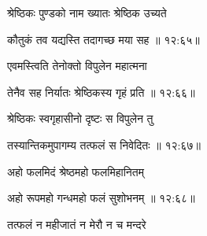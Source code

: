 {\devanagarifont श्रेष्ठिकः पुण्डको नाम ख्यातः श्रेष्ठिक उच्यते \thinspace{\dandab} \dontdisplaylinenum }%
 

{\devanagarifont कौतुकं तव यद्यस्ति तदागच्छ मया सह {॥ १२:६५॥} \veg\dontdisplaylinenum }%
 
{\devanagarifont एवमस्त्विति तेनोक्तो विपुलेन महात्मना \thinspace{\dandab} \dontdisplaylinenum }%


{\devanagarifont तेनैव सह निर्यातः श्रेष्ठिकस्य गृहं प्रति {॥ १२:६६॥} \veg\dontdisplaylinenum }%

{\devanagarifont श्रेष्ठिकः स्वगृहासीनो दृष्टः स विपुलेन तु \thinspace{\dandab} \dontdisplaylinenum }%


{\devanagarifont तस्यान्तिकमुपागम्य तत्फलं स निवेदितः {॥ १२:६७॥} \veg\dontdisplaylinenum }%

{\devanagarifont अहो फलमिदं श्रेष्ठमहो फलमिहानितम् \thinspace{\dandab} \dontdisplaylinenum }%


{\devanagarifont अहो रूपमहो गन्धमहो फलं सुशोभनम् {॥ १२:६८॥} \veg\dontdisplaylinenum }%

{\devanagarifont तत्फलं न महीजातं न मेरौ न च मन्दरे \thinspace{\dandab} \dontdisplaylinenum }%

